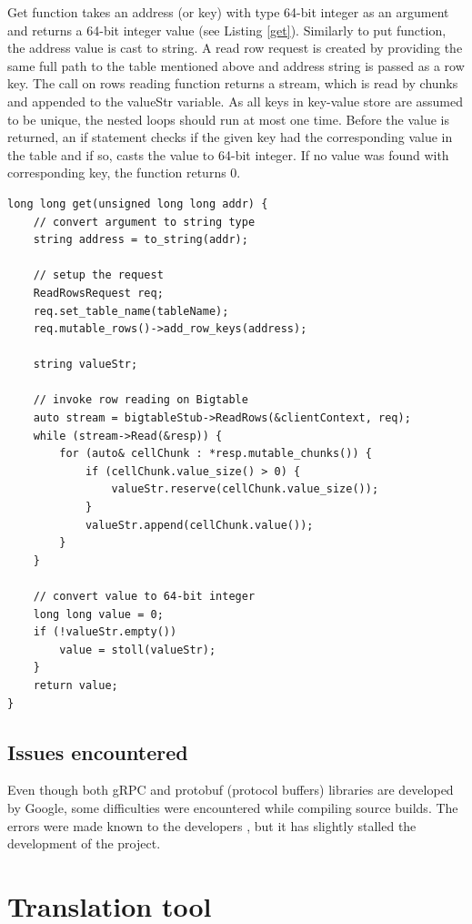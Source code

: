 \documentclass[bsc,frontabs,twoside,singlespacing,parskip,deptreport]{infthesis}     %
\begin{document}
Get function takes an address (or key) with type 64-bit integer as an argument and returns a 64-bit integer value (see Listing \ref{get}). Similarly to put function, the address value is cast to string. A read row request is created by providing the same full path to the table mentioned above and address string is passed as a row key. The call on rows reading function returns a stream, which is read by chunks and appended to the valueStr variable. As all keys in key-value store are assumed to be unique, the nested loops should run at most one time. Before the value is returned, an if statement checks if the given key had the corresponding value in the table and if so, casts the value to 64-bit integer. If no value was found with corresponding key, the function returns 0.

\begin{lstlisting}[caption=Reading content from Bigtable using get() function, label=get, style=block]
long long get(unsigned long long addr) {
	// convert argument to string type
	string address = to_string(addr);

	// setup the request
	ReadRowsRequest req;
	req.set_table_name(tableName);
	req.mutable_rows()->add_row_keys(address);
        
	string valueStr;
	
	// invoke row reading on Bigtable
	auto stream = bigtableStub->ReadRows(&clientContext, req);
	while (stream->Read(&resp)) {
		for (auto& cellChunk : *resp.mutable_chunks()) {
			if (cellChunk.value_size() > 0) {
				valueStr.reserve(cellChunk.value_size());
			}
			valueStr.append(cellChunk.value());
		}
	}
	
	// convert value to 64-bit integer
	long long value = 0;
	if (!valueStr.empty())
		value = stoll(valueStr);
	}
	return value;
}
\end{lstlisting}

\section{Issues encountered}

Even though both gRPC and protobuf (protocol buffers) libraries are developed by Google, some difficulties were encountered while compiling source builds. The errors were made known to the developers \citep{grpc_issue}, but it has slightly stalled the development of the project.

\chapter{Translation tool}
\end{document}
